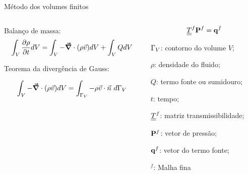 \documentclass[professionalfont]{beamer}
\begin{document}


\begin{frame}{Método dos volumes finitos}

\begin{columns}
\begin{column}{0.6\textwidth}
Balanço de massa:
  \begin{equation}
	\label{eq:volumes_finitos.1}
	\int_{V} \frac{\partial \rho}{\partial t} dV = \int_{V} - \mbox{\boldmath$ \vec{\nabla} $} \cdot (\rho \vec{v}) dV + \int_{V} Q dV
\end{equation}


Teorema da divergência de Gauss:

 \begin{equation}
	 \label{eq:volumes_finitos.2}
	 \int_{V} - \mbox{\boldmath$ \vec{\nabla} $} \cdot (\rho \vec{v}) dV = \int_{\Gamma_{V}} - \rho \vec{v} \cdot \vec{n} \text{ } d \Gamma_{V}
 \end{equation}

\end{column}
\begin{column}{0.4\textwidth}  %
    \begin{equation}
        \underline{\underline{T}}^{f} \mathbf{P}^{f} = \mathbf{q}^{f}
    \end{equation}

    \begin{description}[]
        \small
        \item $\Gamma_{V}$: contorno do volume $V$;
        \item $\rho$: densidade do fluido;
        \item $Q$: termo fonte ou sumidouro;
        \item $t$: tempo;
        \item $\underline{\underline{T}}^{f}$: matriz transmissibilidade;
        \item $\mathbf{P}^{f}$: vetor de pressão;
        \item $\mathbf{q}^{f}$: vetor do termo fonte;
        \item $^{f}$: Malha fina
    \end{description}
    
\end{column}
\end{columns}

\end{frame}
\end{document}
